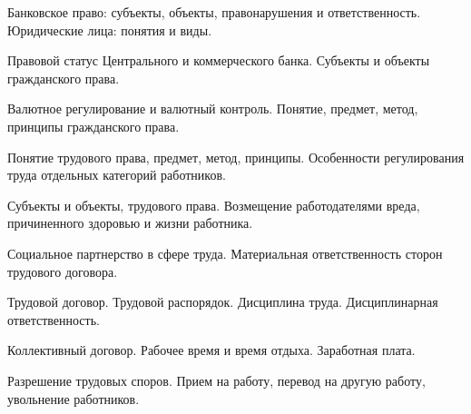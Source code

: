 \documentclass[
	14pt,
	a4paper,
	]
	{scrartcl}
\begin{document}
\vfill

\newpage


\shapk
{}
\setcounter{zad}{0}

\vfill
\z Банковское право: субъекты, объекты, правонарушения и ответственность.
 \vfill
\z Юридические лица: понятия и виды.
 \vfill

\vfill

\newpage


\shapk
{}
\setcounter{zad}{0}

\vfill
\z Правовой статус Центрального и коммерческого банка.
 \vfill
\z Субъекты и объекты гражданского права.
 \vfill

\vfill

\newpage


\shapk
{}
\setcounter{zad}{0}

\vfill
\z Валютное регулирование и валютный контроль.
 \vfill
\z Понятие, предмет, метод, принципы гражданского права.
 \vfill

\vfill

\newpage


\shapk
{}
\setcounter{zad}{0}

\vfill
\z Понятие трудового права, предмет, метод, принципы.
 \vfill
\z Особенности регулирования труда отдельных категорий работников.
 \vfill

\vfill

\newpage


\shapk
{}
\setcounter{zad}{0}

\vfill
\z Субъекты и объекты, трудового права.
 \vfill
\z Возмещение работодателями вреда, причиненного здоровью и жизни работника.
 \vfill

\vfill

\newpage


\shapk
{}
\setcounter{zad}{0}

\vfill
\z Социальное партнерство в сфере труда.
 \vfill
\z Материальная ответственность сторон трудового договора.
 \vfill

\vfill

\newpage


\shapk
{}
\setcounter{zad}{0}

\vfill
\z Трудовой договор.
 \vfill
\z Трудовой распорядок. Дисциплина труда. Дисциплинарная ответственность. 
 \vfill

\vfill

\newpage


\shapk
{}
\setcounter{zad}{0}

\vfill
\z Коллективный договор.
 \vfill
\z Рабочее время и время отдыха. Заработная плата.
 \vfill

\vfill

\newpage


\shapk
{}
\setcounter{zad}{0}

\vfill
\z Разрешение трудовых споров.
 \vfill
\z Прием на работу, перевод на другую работу, увольнение работников.
 \vfill

\vfill

\newpage
\end{document}
